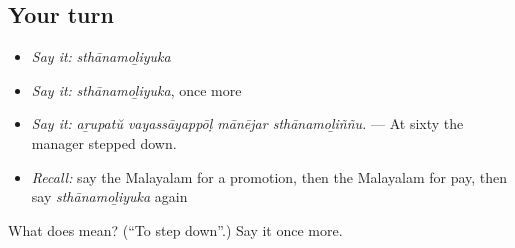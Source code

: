 \subsection*{Your turn}
\begin{itemize}
\raggedright
  \item \emph{Say it:} \emph{sthānamoḻiyuka}
  \item \emph{Say it:} \emph{sthānamoḻiyuka}, once more
  \item \emph{Say it:} \emph{aṟupatŭ vayassāyappōḷ mānējar sthānamoḻiññu.} — At sixty the manager stepped down.
  \item \emph{Recall:} say the Malayalam for a promotion, then the Malayalam for pay, then say \emph{sthānamoḻiyuka} again
\end{itemize}

\begin{tcolorbox}[breakable,colback=teal!4,colframe=teal!35!black,title={Before you move on}]
What does  mean? (\textquotedblleft{}To step down\textquotedblright{}.) Say it once more.
\end{tcolorbox}
